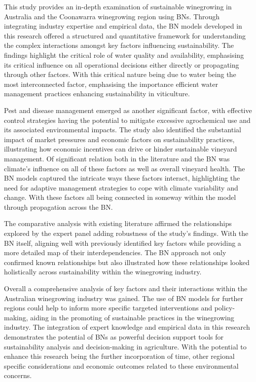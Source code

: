 \documentclass[fleqn,10pt]{wlscirep}
\begin{document}
This study provides an in-depth examination of sustainable winegrowing in Australia and the Coonawarra winegrowing region using BNs. Through integrating industry expertise and empirical data, the BN models developed in this research offered a structured and quantitative framework for understanding the complex interactions amongst key factors influencing sustainability. The findings highlight the critical role of water quality and availability, emphasising its critical influence on all operational decisions either directly or propagating through other factors. With this critical nature being due to water being the most interconnected factor, emphasising the importance efficient water management practices enhancing sustainability in viticulture.

Pest and disease management emerged as another significant factor, with effective control strategies having the potential to mitigate excessive agrochemical use and its associated environmental impacts. The study also identified the substantial impact of market pressures and economic factors on sustainability practices, illustrating how economic incentives can drive or hinder sustainable vineyard management. Of significant relation both in the literature and the BN was climate's influence on all of these factors as well as overall vineyard health. The BN models captured the intricate ways these factors interact, highlighting the need for adaptive management strategies to cope with climate variability and change. With these factors all being connected in someway within the model through propagation across the BN.\@

The comparative analysis with existing literature affirmed the relationships explored by the expert panel adding robustness of the study's findings. With the BN itself, aligning well with previously identified key factors while providing a more detailed map of their interdependencies. The BN approach not only confirmed known relationships but also illustrated how these relationships looked holistically across sustainability within the winegrowing industry.

Overall a comprehensive analysis of key factors and their interactions within the Australian winegrowing industry was gained. The use of BN models for further regions could help to inform more specific targeted interventions and policy-making, aiding in the promoting of sustainable practices in the winegrowing industry. The integration of expert knowledge and empirical data in this research demonstrates the potential of BNs as powerful decision support tools for sustainability analysis and decision-making in agriculture. With the potential to enhance this research being the further incorporation of time, other regional specific considerations and economic outcomes related to these environmental concerns.
\end{document}

